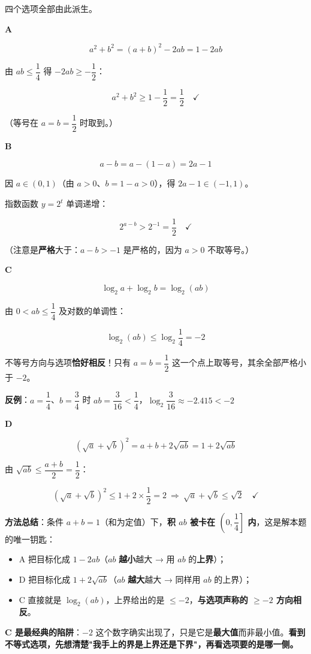 四个选项全部由此派生。

\par\medskip

\textbf{A }

\[a^{2}+b^{2}=(a+b)^{2}-2ab=1-2ab\]

由 $ab\le\dfrac14$ 得 $-2ab\ge-\dfrac12$：

\[a^{2}+b^{2}\ge1-\frac12=\frac12\quad\checkmark\]

（等号在 $a=b=\dfrac12$ 时取到。）

\par\medskip

\textbf{B }

\[a-b=a-(1-a)=2a-1\]

因 $a\in(0,1)$（由 $a>0$、$b=1-a>0$），得 $2a-1\in(-1,1)$。

指数函数 $y=2^{t}$ 单调递增：

\[2^{a-b}>2^{-1}=\frac12\quad\checkmark\]

（注意是\textbf{严格}大于：$a-b>-1$ 是严格的，因为 $a>0$ 不取等号。）

\par\medskip

\textbf{C }

\[\log_2a+\log_2b=\log_2(ab)\]

由 $0<ab\le\dfrac14$ 及对数的单调性：

\[\log_2(ab)\le\log_2\frac14=-2\]

不等号方向与选项\textbf{恰好相反}！只有 $a=b=\dfrac12$ 这一个点上取等号，其余全部严格小于 $-2$。

\textbf{反例}：$a=\dfrac14$、$b=\dfrac34$ 时 $ab=\dfrac3{16}<\dfrac14$，$\log_2\dfrac3{16}\approx-2.415<-2$ 

\par\medskip

\textbf{D }

\[\left(\sqrt a+\sqrt b\right)^{2}=a+b+2\sqrt{ab}=1+2\sqrt{ab}\]

由 $\sqrt{ab}\le\dfrac{a+b}2=\dfrac12$：

\[\left(\sqrt a+\sqrt b\right)^{2}\le1+2\times\frac12=2\ \Longrightarrow\ \sqrt a+\sqrt b\le\sqrt2\quad\checkmark\]


\begin{gktip}
\textbf{方法总结}：条件 $a+b=1$（和为定值）下，\textbf{积 $ab$ 被卡在 $\left(0,\dfrac14\right]$ 内}，这是解本题的唯一钥匙：
\begin{itemize}
\item A 把目标化成 $1-2ab$（$ab$ \textbf{越小}越大 → 用 $ab$ 的\textbf{上界}）；
\item D 把目标化成 $1+2\sqrt{ab}$（$ab$ \textbf{越大}越大 → 同样用 $ab$ 的上界）；
\item C 直接就是 $\log_2(ab)$，上界给出的是 $\le-2$，\textbf{与选项声称的 $\ge-2$ 方向相反}。
\end{itemize}

\textbf{C 是最经典的陷阱}：$-2$ 这个数字确实出现了，只是它是\textbf{最大值}而非最小值。\textbf{看到不等式选项，先想清楚"我手上的界是上界还是下界"，再看选项要的是哪一侧。}
\end{gktip}

